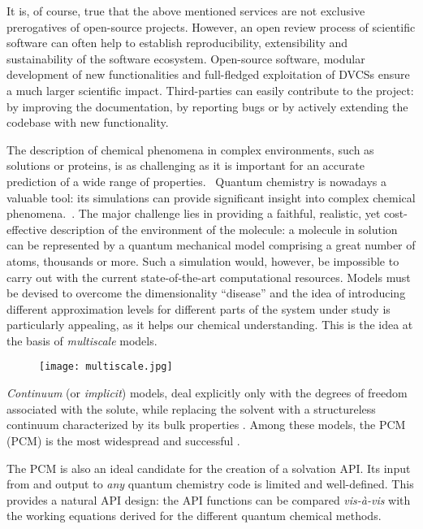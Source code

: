 It is, of course, true that the above mentioned services are not
exclusive prerogatives of open-source projects.
However, an open review process of scientific software can often help
to establish
reproducibility, extensibility and sustainability of the software
ecosystem.
Open-source software, modular development of new functionalities
and full-fledged exploitation of \acsp{DVCS} ensure a much larger scientific
impact. Third-parties can easily contribute to
the project: by improving the documentation, by reporting bugs or
by actively extending the codebase with new functionality.

The description of chemical phenomena in complex environments, such as
solutions or proteins, is as challenging as it is important
for an accurate prediction of a wide range of properties.~\autocite{Reichardt2010-le}
  Quantum chemistry is nowadays a valuable
tool: its simulations can provide significant insight into complex
chemical phenomena.~\autocite{Nobel1998, Nobel2013}.
The major challenge lies in providing a faithful, realistic, yet cost-effective
description of the environment of the molecule:
a molecule in solution can be represented by a quantum mechanical model
comprising a great number of atoms, thousands or more. Such a simulation would,
however, be impossible to carry out with the current state-of-the-art
computational resources.
Models must be devised to overcome the dimensionality ``disease'' and
the idea of introducing different approximation levels for different
parts of the system under study is particularly appealing, as it helps
our chemical understanding. This is the idea at the basis of
\emph{multiscale} models.

\begin{figure}[!htb]
  \centering
  \texttt{[image: multiscale.jpg]}
\end{figure}

\emph{Continuum} (or \emph{implicit}) models, deal explicitly
only with the degrees of freedom associated with the solute, while
replacing the solvent with a structureless continuum characterized by
its bulk properties \cite{Onsager1936-wf}. Among these models, the \acl{PCM} (\acs{PCM})
is the most widespread and successful \cite{Tomasi2005-vm, Mennucci2008-xl}.

The \acs{PCM} is also an ideal candidate for the creation of a solvation \acs{API}.
Its input from and output to \emph{any} quantum chemistry code is
limited and well-defined.
This provides a natural \acs{API} design: the \acs{API} functions can be compared
\emph{vis-à-vis} with the working equations derived for the different
quantum chemical methods.

